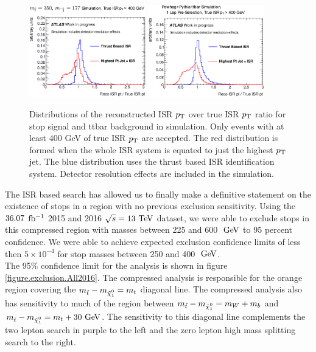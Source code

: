 \begin{figure}[h]
\centering
\includegraphics[width=0.45\textwidth]{./figures/strategy/ThrustAlgoEfficiency.eps}
\includegraphics[width=0.45\textwidth]{./figures/strategy/ThrustAlgoEfficiency_ttbar.eps}
\caption[Distributions of the reconstructed ISR $\pt$ over true ISR $\pt$ ratio for stop signal and ttbar background in simulation]{Distributions of the reconstructed ISR $\pt$ over true ISR $\pt$ ratio for stop signal and ttbar background in simulation.  Only events with at least $400$ GeV of true ISR $\pt$ are accepted.  The red distribution is formed when the whole ISR system is equated to just the highest $\pt$ jet.  The blue distribution uses the thrust based ISR identification system. Detector resolution effects are included in the simulation. }
 \label{fig:ISRPerformanceIntro}
\end{figure}

\indent The ISR based search has allowed us to finally make a definitive statement on the existence of stops in a region with no previous exclusion sensitivity.  Using the $36.07$ $\mbox{fb$^{-1}$}$ 2015 and 2016 $\sqrt{s}=13 \tev$ dataset, we were able to exclude stops in this compressed region with masses between 225 and 600 $\gev$ to 95 percent confidence.  We were able to achieve expected exclusion confidence limits of less then $5 \times 10^{-4}$ for stop masses between 250 and 400 $\gev$.  \\

\indent The 95\% confidence limit for the analysis is shown in figure \ref{figure.exclusion.All2016}.  The compressed analysis is responsible for the orange region covering the $m_{\stop}-m_{\ninoone} = m_t$ diagonal line.  The compressed analysis also has sensitivity to much of the region between $m_{\stop}-m_{\ninoone} = m_W + m_b$ and $m_{\stop}-m_{\ninoone} = m_t + 30 \gev$.  The sensitivity to this diagonal line complements the two lepton search in purple to the left and the zero lepton high mass splitting search to the right.  \\

